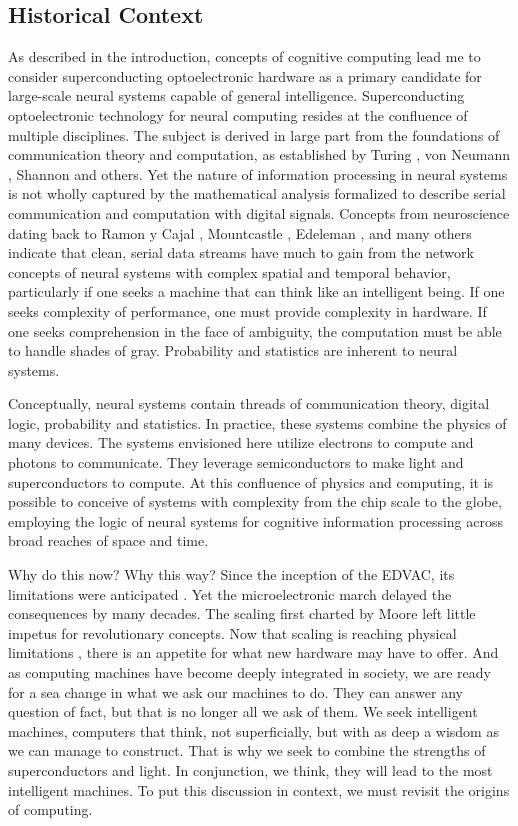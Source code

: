 \documentclass[twocolumn]{article}
\begin{document}
\subsection{\label{sec:history}Historical Context}
As described in the introduction, concepts of cognitive computing lead me to consider superconducting optoelectronic hardware as a primary candidate for large-scale neural systems capable of general intelligence. Superconducting optoelectronic technology for neural computing resides at the confluence of multiple disciplines. The subject is derived in large part from the foundations of communication theory and computation, as established by Turing \cite{tu1936}, von Neumann \cite{ne1945}, Shannon \cite{sh1948} and others. Yet the nature of information processing in neural systems is not wholly captured by the mathematical analysis formalized to describe serial communication and computation with digital signals. Concepts from neuroscience dating back to Ramon y Cajal \cite{ra1908}, Mountcastle \cite{mo1978}, Edeleman \cite{ed1978}, and many others indicate that clean, serial data streams have much to gain from the network concepts of neural systems with complex spatial and temporal behavior, particularly if one seeks a machine that can think like an intelligent being. If one seeks complexity of performance, one must provide complexity in hardware. If one seeks comprehension in the face of ambiguity, the computation must be able to handle shades of gray. Probability and statistics are inherent to neural systems. 

Conceptually, neural systems contain threads of communication theory, digital logic, probability and statistics. In practice, these systems combine the physics of many devices. The systems envisioned here utilize electrons to compute and photons to communicate. They leverage semiconductors to make light and superconductors to compute. At this confluence of physics and computing, it is possible to conceive of systems with complexity from the chip scale to the globe, employing the logic of neural systems for cognitive information processing across broad reaches of space and time. 

Why do this now? Why this way? Since the inception of the EDVAC, its limitations were anticipated \cite{}. Yet the microelectronic march delayed the consequences by many decades. The scaling first charted by Moore \cite{mo1965} left little impetus for revolutionary concepts. Now that scaling is reaching physical limitations \cite{}, there is an appetite for what new hardware may have to offer. And as computing machines have become deeply integrated in society, we are ready for a sea change in what we ask our machines to do. They can answer any question of fact, but that is no longer all we ask of them. We seek intelligent machines, computers that think, not superficially, but with as deep a wisdom as we can manage to construct. That is why we seek to combine the strengths of superconductors and light. In conjunction, we think, they will lead to the most intelligent machines. To put this discussion in context, we must revisit the origins of computing.
\end{document}
